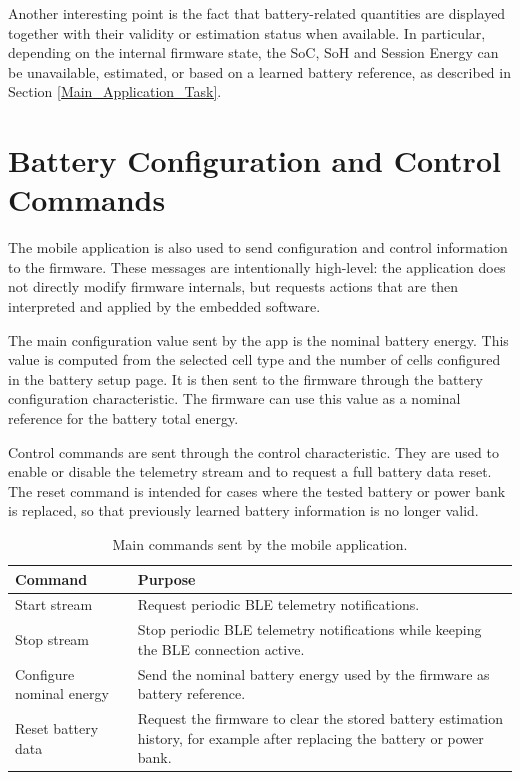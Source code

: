 Another interesting point is the fact that battery-related quantities are displayed together with their validity or estimation status when available. In particular, depending on the internal firmware state, the SoC, SoH and Session Energy can be unavailable, estimated, or based on a learned battery reference, as described in Section \ref{Main_Application_Task}.


\section{Battery Configuration and Control Commands}
\label{sec:app_battery_config_commands}

The mobile application is also used to send configuration and control information to the firmware. These messages are intentionally high-level: the application does not directly modify firmware internals, but requests actions that are then interpreted and applied by the embedded software.

The main configuration value sent by the app is the nominal battery energy. This value is computed from the selected cell type and the number of cells configured in the battery setup page. It is then sent to the firmware through the battery configuration characteristic. The firmware can use this value as a nominal reference for the battery total energy.

Control commands are sent through the control characteristic. They are used to enable or disable the telemetry stream and to request a full battery data reset. The reset command is intended for cases where the tested battery or power bank is replaced, so that previously learned battery information is no longer valid.

\begin{table}[H]
	\centering
	\small
	\caption{Main commands sent by the mobile application.}
	\label{tab:mobile_app_commands}
	\begin{tabularx}{\textwidth}{lX}
		\toprule
		\textbf{Command} & \textbf{Purpose} \\
		\midrule
		
		Start stream &
		Request periodic BLE telemetry notifications. \\
		
		Stop stream &
		Stop periodic BLE telemetry notifications while keeping the BLE connection active. \\
		
		Configure nominal energy &
		Send the nominal battery energy used by the firmware as battery reference. \\
		
		Reset battery data &
		Request the firmware to clear the stored battery estimation history, for example after replacing the battery or power bank. \\
		
		\bottomrule
	\end{tabularx}
\end{table}